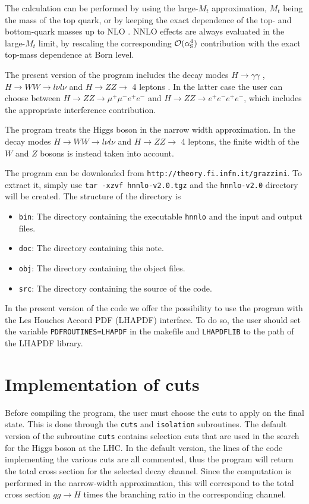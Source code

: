 \documentclass[12pt]{article}
\newcommand\as{\alpha_{\mathrm{S}}}
\begin{document}
The calculation can be performed
by using the large-$M_{t}$ approximation, $M_t$ being the
mass of the top quark, or by keeping the exact dependence of the top- and bottom-quark masses up to NLO \cite{Grazzini:2013mca}.
NNLO effects are always evaluated in the large-$M_t$ limit, by rescaling the corresponding ${\cal O}(\as^4)$ contribution with the exact top-mass dependence at Born level.


The present version of the program includes the decay modes
$H\to \gamma\gamma$ \cite{Catani:2007vq}, $H\to WW\to l\nu l\nu$ and $H\to ZZ\to$ 4 leptons \cite{Grazzini:2008tf}.
In the latter case the user can choose between $H\to ZZ\to \mu^+\mu^- e^+e^-$ and $H\to ZZ\to e^+e^-e^+e^-$, which includes the appropriate interference contribution.


The program treats the Higgs boson in the narrow width approximation. In the decay modes
$H\to WW\to l\nu l\nu$ and $H\to ZZ\to$ 4 leptons,
the finite width of the $W$ and $Z$ bosons is instead taken into account.

The program can be downloaded from {\tt http://theory.fi.infn.it/grazzini}.
To extract it, simply use {\tt tar -xzvf hnnlo-v2.0.tgz} and the {\tt hnnlo-v2.0} directory will be created.
The structure of the directory is
\begin{itemize}
\item {\tt bin}: The directory containing the executable {\tt hnnlo} and the input and output files.
\item {\tt doc}: The directory containing this note.
\item {\tt obj}: The directory containing the object files.
\item {\tt src}: The directory containing the source of the code.
\end{itemize}

In the present version of the code
we offer the possibility to use the program with the 
Les Houches Accord PDF (LHAPDF) interface.
To do so, the user should set the variable 
{\tt PDFROUTINES=LHAPDF} in the makefile and
{\tt LHAPDFLIB} to the path of the LHAPDF library.


\section{Implementation of cuts}

Before compiling the program, the user must choose the cuts
to apply on the final state.
This is done through the {\tt cuts} and {\tt isolation} subroutines.
The default version of the subroutine {\tt cuts} contains selection cuts that are used in the search for the Higgs boson at the LHC.
In the default version, the lines of the code implementing the various cuts are all commented, thus the program will return the total cross section for the selected decay channel. Since the computation is performed in the narrow-width approximation, this will correspond
to the total cross section $gg\to H$ times the branching ratio in the corresponding channel.
\end{document}
